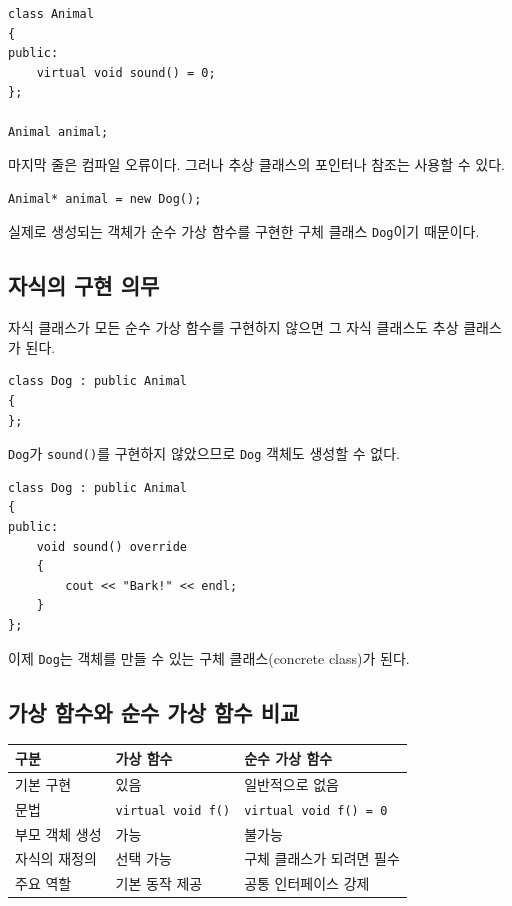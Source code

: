 \documentclass[11pt,a4paper]{article}
\begin{document}
\begin{lstlisting}
class Animal
{
public:
    virtual void sound() = 0;
};

Animal animal;
\end{lstlisting}

마지막 줄은 컴파일 오류이다. 그러나 추상 클래스의 포인터나 참조는 사용할 수 있다.

\begin{lstlisting}
Animal* animal = new Dog();
\end{lstlisting}

실제로 생성되는 객체가 순수 가상 함수를 구현한 구체 클래스 \texttt{Dog}이기 때문이다.

\subsection{자식의 구현 의무}
자식 클래스가 모든 순수 가상 함수를 구현하지 않으면 그 자식 클래스도 추상 클래스가 된다.

\begin{lstlisting}
class Dog : public Animal
{
};
\end{lstlisting}

\texttt{Dog}가 \texttt{sound()}를 구현하지 않았으므로 \texttt{Dog} 객체도 생성할 수 없다.

\begin{lstlisting}
class Dog : public Animal
{
public:
    void sound() override
    {
        cout << "Bark!" << endl;
    }
};
\end{lstlisting}

이제 \texttt{Dog}는 객체를 만들 수 있는 구체 클래스(concrete class)가 된다.

\subsection{가상 함수와 순수 가상 함수 비교}
\begin{center}
\begin{tabular}{lll}
\toprule
구분 & 가상 함수 & 순수 가상 함수 \\
\midrule
기본 구현 & 있음 & 일반적으로 없음 \\
문법 & \texttt{virtual void f()} & \texttt{virtual void f() = 0} \\
부모 객체 생성 & 가능 & 불가능 \\
자식의 재정의 & 선택 가능 & 구체 클래스가 되려면 필수 \\
주요 역할 & 기본 동작 제공 & 공통 인터페이스 강제 \\
\bottomrule
\end{tabular}
\end{center}
\end{document}
